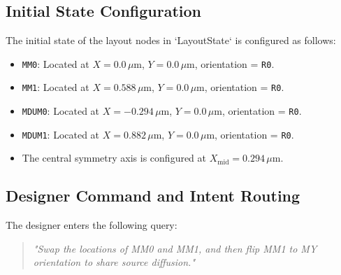 \subsection{Initial State Configuration}
The initial state of the layout nodes in `LayoutState` is configured as follows:
\begin{itemize}
    \item \texttt{MM0}: Located at $X = 0.0\,\mu\text{m}$, $Y = 0.0\,\mu\text{m}$, orientation = \texttt{R0}.
    \item \texttt{MM1}: Located at $X = 0.588\,\mu\text{m}$, $Y = 0.0\,\mu\text{m}$, orientation = \texttt{R0}.
    \item \texttt{MDUM0}: Located at $X = -0.294\,\mu\text{m}$, $Y = 0.0\,\mu\text{m}$, orientation = \texttt{R0}.
    \item \texttt{MDUM1}: Located at $X = 0.882\,\mu\text{m}$, $Y = 0.0\,\mu\text{m}$, orientation = \texttt{R0}.
    \item The central symmetry axis is configured at $X_{\text{mid}} = 0.294\,\mu\text{m}$.
\end{itemize}

\subsection{Designer Command and Intent Routing}
The designer enters the following query:
\begin{quote}
    \textit{"Swap the locations of MM0 and MM1, and then flip MM1 to MY orientation to share source diffusion."}
\end{quote}

